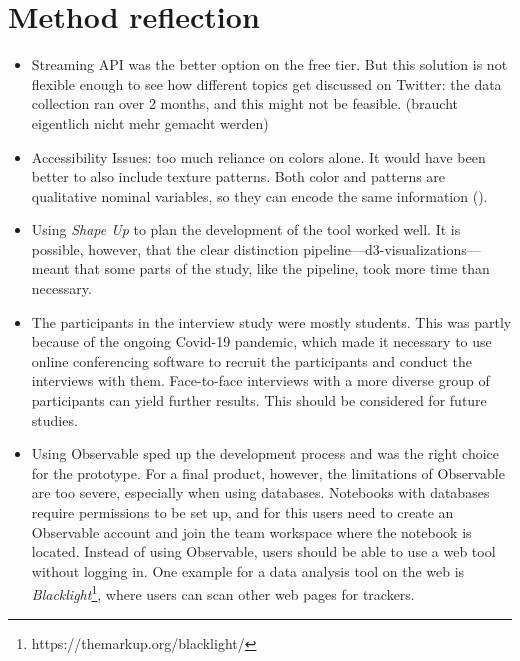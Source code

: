 \section{Method reflection}
\begin{itemize}
    \item Streaming API was the better option on the free tier. But this solution is not flexible enough to see how different topics get discussed on Twitter: the data collection ran over 2 months, and this might not be feasible. (braucht eigentlich nicht mehr gemacht werden)
    \item Accessibility Issues: too much reliance on colors alone. It would have been better to also include texture patterns. Both color and patterns are qualitative nominal variables, so they can encode the same information (\cite[1860]{bornerDataVisualizationLiteracy2019}).
    \item Using \emph{Shape Up} to plan the development of the tool worked well. It is possible, however, that the clear distinction pipeline---d3-visualizations---meant that some parts of the study, like the pipeline, took more time than necessary.
    \item The participants in the interview study were mostly students. This was partly because of the ongoing Covid-19 pandemic, which made it necessary to use online conferencing software to recruit the participants and conduct the interviews with them. Face-to-face interviews with a more diverse group of participants can yield further results. This should be considered for future studies.
    \item Using Observable sped up the development process and was the right choice for the prototype. For a final product, however, the limitations of Observable are too severe, especially when using databases. Notebooks with databases require permissions to be set up, and for this users need to create an Observable account and join the team workspace where the notebook is located. Instead of using Observable, users should be able to use a web tool without logging in. One example for a data analysis tool on the web is \emph{Blacklight}\footnote{https://themarkup.org/blacklight/}, where users can scan other web pages for trackers.
\end{itemize}
